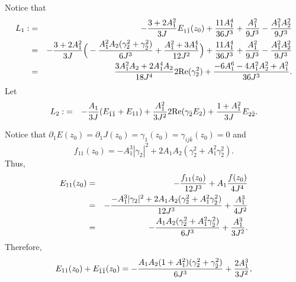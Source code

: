 \documentclass[12pt]{amsart}
\def\d{\partial}
\def\d{\partial}
\begin{document}
Notice that
\begin{eqnarray*}
L_1:&=&-{3+2A_1^2 \over 3J}  E_{1\bar1}(z_0)+{11 A_1^4 \over 36J^3}+{A_1^2  \over 9J^3}-{A_1^2 A_2^2 \over 9J^3}  \\
&=&-{3+2A_1^2 \over 3J} \Big( -{A_1^2 A_2(\gamma_2^2+\gamma_{\bar2}^2)\over 6 J^3}+{A_1^2 +3A_1^4\over 12 J^2}\Big)
+{11 A_1^4 \over 36J^3}+{A_1^2  \over 9J^3}-{A_1^2 A_2^2 \over 9J^3}  \\
&=& {3A_1^2A_2+2A_1^4A_2 \over 18 J^4} 2\hbox{Re}(\gamma_2^2)+ {-6A_1^6 -4A_1^2 A_2^2+A_1^2 \over 36 J^3}.
\end{eqnarray*}
Let
\begin{eqnarray*}
L_2:&=& -{A_1 \over 3J} (  E_{\bar1 \bar1}+E_{11})+{A_1^2 \over 3J^2} 2\hbox{Re}(\gamma_{\bar2} E_2) +{1+A_1^2 \over 3J}E_{2\bar2}.
\end{eqnarray*}

Notice that $\d_1E(z_0)=\d_1J(z_0)=\gamma_1(z_0)=\gamma_{i j\bar k}(z_0)=0$ and
$$
f_{11}(z_0)=-A_1^3|\gamma_2|^2+2A_1A_2(\gamma_2^2+A_1^2 \gamma_{\bar2}^2).
$$
Thus,
\begin{eqnarray*}
E_{11}(z_0)&=&-{f_{11}(z_0)\over 12 J^3} +A_1{f(z_0)\over 4 J^4} \\
&=&-{-A_1^3|\gamma_2|^2+2A_1A_2(\gamma_2^2+A_1^2 \gamma_{\bar2}^2)
\over 12 J^3}+{A_1^3  \over 4 J^2}\\
&=&-{A_1A_2(\gamma_2^2+A_1^2 \gamma_{\bar2}^2)
\over 6  J^3}+{A_1^3  \over 3 J^2}.
\end{eqnarray*}
Therefore,
$$
E_{11}(z_0)+E_{\bar1\bar1}(z_0)=-{A_1A_2 (1+A_1^2) (\gamma_2^2+ \gamma_{\bar2}^2)
\over 6  J^3}+{2A_1^3  \over 3 J^2},
$$
\end{document}
